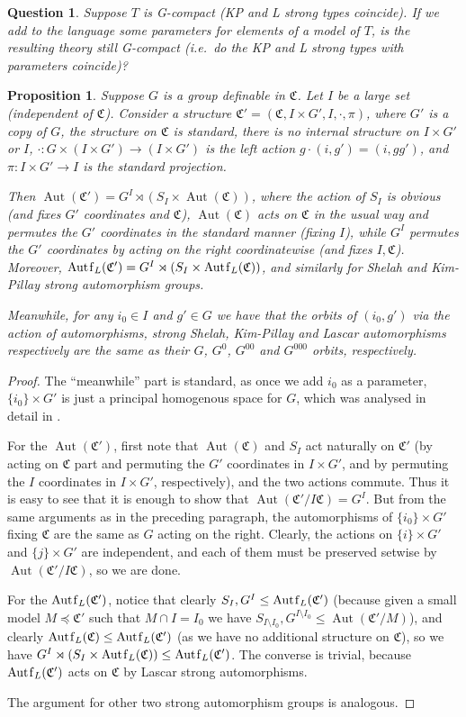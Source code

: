 \documentclass[final,a4paper,12pt]{amsart}
\newcommand{\fC}{{\mathfrak C}}
\DeclareMathOperator{\Aut}{{Aut}}
\DeclareMathOperator{\Autf}{{Aut\mkern 0.5\thinmuskip f}}
\newtheorem{prop}[thm]{Proposition}
\newtheorem{qu}[thm]{Question}
\theoremstyle{remark}
\theoremstyle{definition}
\begin{document}
	\begin{qu}
		Suppose $T$ is G-compact (KP and L strong types coincide). If we add to the language some parameters for elements of a model of $T$, is the resulting theory still G-compact (i.e.\ do the KP and L strong types with parameters coincide)?
	\end{qu}
	
	\begin{prop}
		Suppose $G$ is a group definable in $\fC$. Let $I$ be a large set (independent of $\fC$). Consider a structure $\fC'=(\fC,I\times G',I,\cdot,\pi)$, where $G'$ is a copy of $G$, the structure on $\fC$ is standard, there is no internal structure on $I\times G'$ or $I$, $\cdot\colon G\times (I\times G')\to (I\times G')$ is the left action $g\cdot(i,g')=(i,gg')$, and $\pi\colon I\times G'\to I$ is the standard projection.
		
		Then $\Aut(\fC')=G^I\rtimes(S_I\times \Aut(\fC))$, where the action of $S_I$ is obvious (and fixes $G'$ coordinates and $\fC$), $\Aut(\fC)$ acts on $\fC$ in the usual way and permutes the $G'$ coordinates in the standard manner (fixing $I$), while $G^I$ permutes the $G'$ coordinates by acting on the right coordinatewise (and fixes $I,\fC$). Moreover, $\Autf_L(\fC')=G^I\rtimes(S_I\times \Autf_L(\fC))$, and similarly for Shelah and Kim-Pillay strong automorphism groups.
		
		Meanwhile, for any $i_0\in I$ and $g'\in G$ we have that the orbits of $(i_0,g')$ via the action of automorphisms, strong Shelah, Kim-Pillay and Lascar automorphisms respectively are the same as their $G$, $G^0$, $G^{00}$ and $G^{000}$ orbits, respectively. 
	\end{prop}
	\begin{proof}
		The ``meanwhile'' part is standard, as once we add $i_0$ as a parameter, $\{i_0\}\times G'$ is just a principal homogenous space for $G$, which was analysed in detail in \cite{GN08}.
		
		For the $\Aut(\fC')$, first note that $\Aut(\fC)$ and $S_I$ act naturally on $\fC'$ (by acting on $\fC$ part and permuting the $G'$ coordinates in $I\times G'$, and by permuting the $I$ coordinates in $I\times G'$, respectively), and the two actions commute. Thus it is easy to see that it is enough to show that $\Aut(\fC'/I\fC)= G^I$. But from the same arguments as in the preceding paragraph, the automorphisms of $\{i_0\}\times G'$ fixing $\fC$ are the same as $G$ acting on the right. Clearly, the actions on $\{i\}\times G'$ and $\{j\}\times G'$ are independent, and each of them must be preserved setwise by $\Aut(\fC'/I\fC)$, so we are done.
		
		For the $\Autf_L(\fC')$, notice that clearly $S_I, G^I\leq \Autf_L(\fC')$ (because given a small model $M\preceq \fC'$ such that $M\cap I=I_0$ we have $S_{I\setminus I_0},G^{I\setminus I_0}\leq \Aut(\fC'/M)$), and clearly $\Autf_L(\fC)\leq \Autf_L(\fC')$ (as we have no additional structure on $\fC$), so we have $G^I\rtimes(S_I\times \Autf_L(\fC))\leq \Autf_L(\fC')$. The converse is trivial, because $\Autf_L(\fC')$ acts on $\fC$ by Lascar strong automorphisms.
		
		The argument for other two strong automorphism groups is analogous.
	\end{proof}
	
\end{document}
